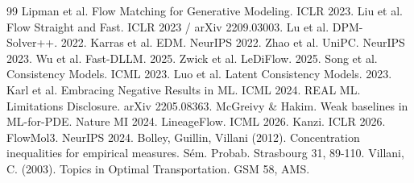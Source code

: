 \documentclass[journal,twocolumn,final]{IEEEtran}
\begin{document}
\begingroup
\scriptsize
\sloppy
\setlength{\itemsep}{0pt}
\setlength{\parskip}{0pt}
\begin{thebibliography}{99}
 Lipman et al. Flow Matching for Generative Modeling. ICLR 2023.
 Liu et al. Flow Straight and Fast. ICLR 2023 / arXiv 2209.03003.
 Lu et al. DPM-Solver++. 2022.
 Karras et al. EDM. NeurIPS 2022.
 Zhao et al. UniPC. NeurIPS 2023.
 Wu et al. Fast-DLLM. 2025.
 Zwick et al. LeDiFlow. 2025.
 Song et al. Consistency Models. ICML 2023.
 Luo et al. Latent Consistency Models. 2023.
 Karl et al. Embracing Negative Results in ML. ICML 2024.
 REAL ML. Limitations Disclosure. arXiv 2205.08363.
 McGreivy \& Hakim. Weak baselines in ML-for-PDE. Nature MI 2024.
 LineageFlow. ICML 2026.
 Kanzi. ICLR 2026.
 FlowMol3. NeurIPS 2024.
 Bolley, Guillin, Villani (2012). Concentration inequalities for empirical measures. Sém. Probab. Strasbourg 31, 89-110.
 Villani, C. (2003). Topics in Optimal Transportation. GSM 58, AMS.
\end{thebibliography}
\endgroup
\end{document}
